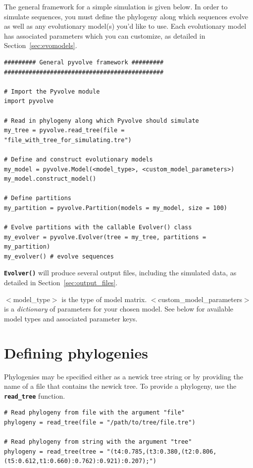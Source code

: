 \documentclass{article}
\newcommand{\code}[1]{\textbf{\texttt{\small{#1}}}}
\begin{document}
The general framework for a simple simulation is given below. In order to simulate sequences, you must define the phylogeny along which sequences evolve as well as any evolutionary model(s) you'd like to use. Each evolutionary model has associated parameters which you can customize, as detailed in Section~\ref{sec:evomodels}.

\begin{lstlisting}
######### General pyvolve framework #########
#############################################

# Import the Pyvolve module
import pyvolve

# Read in phylogeny along which Pyvolve should simulate
my_tree = pyvolve.read_tree(file = "file_with_tree_for_simulating.tre")

# Define and construct evolutionary models
my_model = pyvolve.Model(<model_type>, <custom_model_parameters>)
my_model.construct_model()

# Define partitions
my_partition = pyvolve.Partition(models = my_model, size = 100)

# Evolve partitions with the callable Evolver() class
my_evolver = pyvolve.Evolver(tree = my_tree, partitions = my_partition)
my_evolver() # evolve sequences
\end{lstlisting}

\code{Evolver()} will produce several output files, including the simulated data, as detailed in Section~\ref{sec:output_files}.

$<$model\_type$>$ is the type of model matrix. $<$custom\_model\_parameters$>$ is a \textit{dictionary} of parameters for your chosen model. See below for available model types and associated parameter keys.



\section{Defining phylogenies}\label{sec:phylogeny}

Phylogenies may be specified either as a newick tree string or by providing the name of a file that contains the newick tree. To provide a phylogeny, use the \code{read\_tree} function.
\begin{lstlisting}
# Read phylogeny from file with the argument "file"
phylogeny = read_tree(file = "/path/to/tree/file.tre")

# Read phylogeny from string with the argument "tree"
phylogeny = read_tree(tree = "(t4:0.785,(t3:0.380,(t2:0.806,(t5:0.612,t1:0.660):0.762):0.921):0.207);")
\end{lstlisting}
\end{document}

